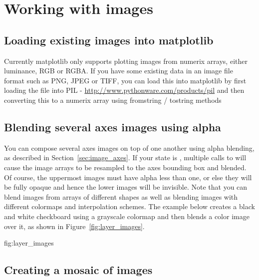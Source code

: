 \documentclass[twoside]{book}
\begin{document}
\section{Working with images}

\subsection{Loading existing images into matplotlib}
\label{cbook:image_files}
Currently matplotlib only supports plotting images from numerix
arrays, either luminance, RGB or RGBA.  If you have some existing data
in an image file format such as PNG, JPEG or TIFF, you can load this
into matplotlib by first loading the file into PIL -
\url{http://www.pythonware.com/products/pil} and then converting this
to a numerix array using fromstring / tostring methods



\subsection{Blending several axes images using alpha}
\label{cbook:layer_images}

You can compose several axes images on top of one another using alpha
blending, as described in Section~\ref{sec:image_axes}.  If your
 state is , multiple calls to
 will cause the image arrays to be resampled to the
axes bounding box and blended.  Of course, the uppermost images must
have alpha less than one, or else they will be fully opaque and hence
the lower images will be invisible.  Note that you can blend images
from arrays of different shapes as well as blending images with
different colormaps and interpolation schemes.  The example below
creates a black and white checkboard using a grayscale colormap and
then blends a color image over it, as shown in
Figure~\ref{fig:layer_images}.

{fig:layer_images}




\subsection{Creating a mosaic of images}
\label{cbook:figure_mosaic}
\end{document}
